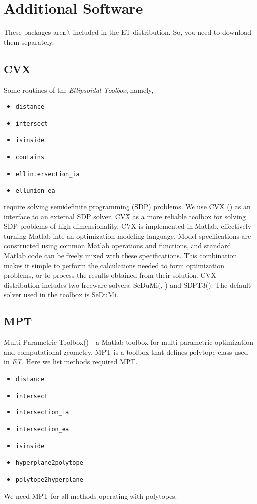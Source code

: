 \section{Additional Software}
These packages aren't included in the ET distribution. 
So, you need to download them separately. 
\subsection{CVX}
Some routines of the {\it Ellipsoidal Toolbox}, namely,
\begin{itemize}
\item {\tt distance}
\item {\tt intersect}
\item {\tt isinside}
\item {\tt contains}
\item {\tt ellintersection\_ia}
\item {\tt ellunion\_ea}
\end{itemize}
require solving semidefinite programming (SDP) problems.
We use CVX (\cite{cvxhp}) as an
interface to an external SDP solver. CVX as a more reliable toolbox
for solving SDP problems of high dimensionality. 
CVX is implemented in Matlab, effectively turning Matlab into an 
optimization modeling language. Model specifications are constructed
using common Matlab operations and functions, and standard 
Matlab code can be freely mixed with these specifications. 
This combination makes it simple to perform the calculations needed 
to form optimization problems, or to process the results
obtained from their solution. CVX distribution includes two freeware 
solvers: SeDuMi(\cite{sedumi}, \cite{sedumihp})
and SDPT3(\cite{sdpt}). The default solver used in the toolbox is SeDuMi.

\subsection{MPT}
Multi-Parametric Toolbox(\cite{mpt}) - a Matlab toolbox for multi-parametric
optimization and computational geometry. MPT is a toolbox 
that defines polytope class
used in {\it ET}.
Here we list methods required MPT.
\begin{itemize}
\item {\tt distance}
\item {\tt intersect}
\item {\tt intersection\_ia}
\item {\tt intersection\_ea}
\item {\tt isinside}
\item {\tt hyperplane2polytope}
\item {\tt polytope2hyperplane}
\end{itemize}
We need MPT for all methods operating with polytopes.


